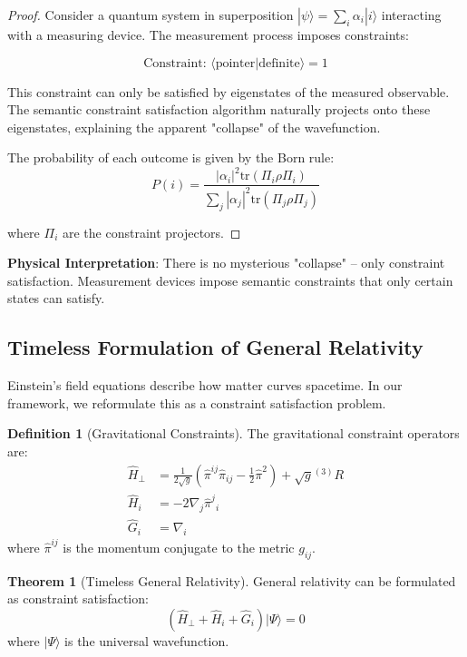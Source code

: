 \documentclass[11pt]{article}
\theoremstyle{definition}
\newtheorem{definition}{Definition}[section]
\newtheorem{theorem}{Theorem}[section]
\newcommand{\tr}{\text{tr}}
\begin{document}
\begin{proof}
Consider a quantum system in superposition $|\psi\rangle = \sum_i \alpha_i |i\rangle$ interacting with a measuring device. The measurement process imposes constraints:

\begin{equation}
\text{Constraint: } \langle \text{pointer}|\text{definite}\rangle = 1
\end{equation}

This constraint can only be satisfied by eigenstates of the measured observable. The semantic constraint satisfaction algorithm naturally projects onto these eigenstates, explaining the apparent "collapse" of the wavefunction.

The probability of each outcome is given by the Born rule:
\begin{equation}
P(i) = \frac{|\alpha_i|^2 \tr(\Pi_i \rho \Pi_i)}{\sum_j |\alpha_j|^2 \tr(\Pi_j \rho \Pi_j)}
\end{equation}

where $\Pi_i$ are the constraint projectors.
\end{proof}

\textbf{Physical Interpretation}: There is no mysterious "collapse" – only constraint satisfaction. Measurement devices impose semantic constraints that only certain states can satisfy.

\subsection{Timeless Formulation of General Relativity}

Einstein's field equations describe how matter curves spacetime. In our framework, we reformulate this as a constraint satisfaction problem.

\begin{definition}[Gravitational Constraints]
The gravitational constraint operators are:
\begin{align}
\hat{H}_\perp &= \frac{1}{2\sqrt{g}}(\hat{\pi}^{ij}\hat{\pi}_{ij} - \frac{1}{2}\hat{\pi}^2) + \sqrt{g}{}^{(3)}R \\
\hat{H}_i &= -2\nabla_j \hat{\pi}^j{}_i \\
\hat{G}_i &= \nabla_i
\end{align}
where $\hat{\pi}^{ij}$ is the momentum conjugate to the metric $g_{ij}$.
\end{definition}

\begin{theorem}[Timeless General Relativity]
General relativity can be formulated as constraint satisfaction:
\begin{equation}
(\hat{H}_\perp + \hat{H}_i + \hat{G}_i)|\Psi\rangle = 0
\end{equation}
where $|\Psi\rangle$ is the universal wavefunction.
\end{theorem}
\end{document}
